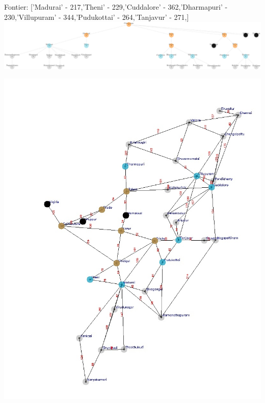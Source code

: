 \documentclass[xcolor=table]{beamer}
\begin{document}
\begin{frame}
  { \tiny Fontier: ['Madurai' - 217,'Theni' - 229,'Cuddalore' - 362,'Dharmapuri' - 230,'Villupuram' - 344,'Pudukottai' - 264,'Tanjavur' - 271,] }
  \includegraphics[width=1\textwidth]{../UCSNodes/14-1.png}
  \begin{center}
    \includegraphics[height=0.55\textheight]{../UCSoutput/tamilUCS12.jpg}
  \end{center}
\end{frame}
\end{document}
